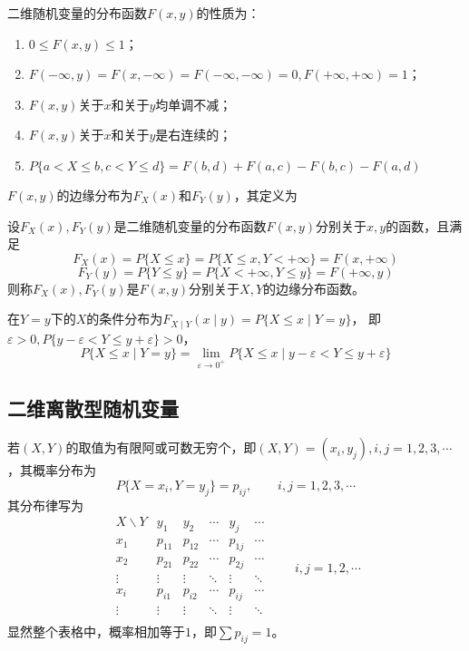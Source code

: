 二维随机变量的分布函数$F(x,y)$的性质为：
\begin{enumerate}[(1)]
    \item $0\leq F(x,y) \leq 1$；
    \item $F(-\infty,y) = F(x,-\infty) = F(-\infty,-\infty) = 0, F(+\infty,+\infty)=1$；
    \item $F(x,y)$关于$x$和关于$y$均单调不减；
    \item $F(x,y)$关于$x$和关于$y$是右连续的；
    \item $P\{ a< X \leq b, c< Y \leq d \} = F(b,d) + F(a,c) - F(b,c) - F(a,d)$
\end{enumerate}

$F(x,y)$的边缘分布为$F_X(x)$和$F_Y(y)$，其定义为
\begin{definition}
    设$F_X(x),F_Y(y)$是二维随机变量的分布函数$F(x,y)$分别关于$x,y$的函数，且满足
    \[ F_X(x) = P\{ X\leq x \} = P\{ X\leq x, Y < +\infty \} = F(x,+\infty) \]
    \[ F_Y(y) = P\{ Y\leq y \} = P\{ X < +\infty, Y\leq y  \} = F(+\infty,y) \]
    则称$F_X(x),F_Y(y)$是$F(x,y)$分别关于$X,Y$的边缘分布函数。
\end{definition}

在$Y=y$下的$X$的条件分布为$F_{X\mid Y}(x\mid y) = P\{X\leq x \mid Y=y \}$，
即$\varepsilon > 0, P\{y-\varepsilon < Y \leq y +\varepsilon\}>0$，
\[ P\{ X\leq x \mid Y = y \} = \lim_{\varepsilon\to 0^+} P\{X\leq x \mid y-\varepsilon < Y \leq y +\varepsilon \} \]

\subsection{二维离散型随机变量}
若$(X,Y)$的取值为有限阿或可数无穷个，即$(X,Y)=(x_i,y_j), i,j=1,2,3,\cdots$，其概率分布为
\[ P\{ X=x_i, Y=y_j \} = p_{ij}, \qquad i,j=1,2,3,\cdots \]
其分布律写为
\[
    \begin{array}{c|ccccc}
        X\backslash Y & y_1    & y_2    & \cdots & y_j    & \cdots \\ \hline
        x_1           & p_{11} & p_{12} & \cdots & p_{1j} & \cdots \\
        x_2           & p_{21} & p_{22} & \cdots & p_{2j} & \cdots \\
        \vdots        & \vdots & \vdots & \ddots & \vdots & \ddots \\
        x_i           & p_{i1} & p_{i2} & \cdots & p_{ij} & \cdots \\
        \vdots        & \vdots & \vdots & \ddots & \vdots & \ddots \\
    \end{array}
    \qquad i,j = 1,2,\cdots
\]
显然整个表格中，概率相加等于$1$，即$\sum p_{ij} = 1$。

